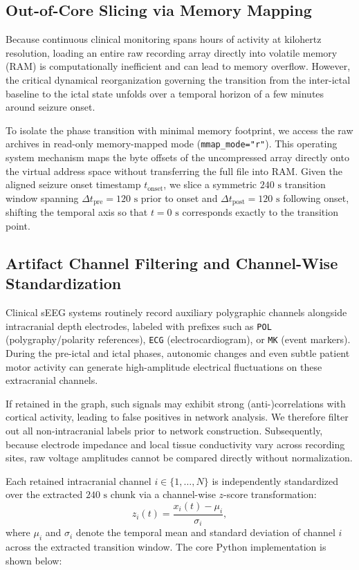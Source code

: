 \subsection{Out-of-Core Slicing via Memory Mapping}
Because continuous clinical monitoring spans hours of activity at kilohertz resolution, loading an entire raw recording array directly into volatile memory (RAM) is computationally inefficient and can lead to memory overflow. However, the critical dynamical reorganization governing the transition from the inter-ictal baseline to the ictal state unfolds over a temporal horizon of a few minutes around seizure onset.

To isolate the phase transition with minimal memory footprint, we access the raw archives in read-only memory-mapped mode (\texttt{mmap\_mode="r"}). This operating system mechanism maps the byte offsets of the uncompressed array directly onto the virtual address space without transferring the full file into RAM. Given the aligned seizure onset timestamp $t_{\text{onset}}$, we slice a symmetric $240\text{ s}$ transition window spanning $\Delta t_{\text{pre}} = 120\text{ s}$ prior to onset and $\Delta t_{\text{post}} = 120\text{ s}$ following onset, shifting the temporal axis so that $t = 0\text{ s}$ corresponds exactly to the transition point.

\subsection{Artifact Channel Filtering and Channel-Wise Standardization}
Clinical sEEG systems routinely record auxiliary polygraphic channels alongside intracranial depth electrodes, labeled with prefixes such as \texttt{POL} (polygraphy/polarity references), \texttt{ECG} (electrocardiogram), or \texttt{MK} (event markers). During the pre-ictal and ictal phases, autonomic changes and even subtle patient motor activity can generate high-amplitude electrical fluctuations on these extracranial channels.

If retained in the graph, such signals may exhibit strong (anti-)correlations with cortical activity, leading to false positives in network analysis. We therefore filter out all non-intracranial labels prior to network construction. Subsequently, because electrode impedance and local tissue conductivity vary across recording sites, raw voltage amplitudes cannot be compared directly without normalization.

Each retained intracranial channel $i \in \{1, \dots, N\}$ is independently standardized over the extracted $240\text{ s}$ chunk via a channel-wise $z$-score transformation:
\begin{equation}
    z_i(t) = \frac{x_i(t) - \mu_i}{\sigma_i},
    \label{eq:zscore}
\end{equation}
where $\mu_i$ and $\sigma_i$ denote the temporal mean and standard deviation of channel $i$ across the extracted transition window. The core Python implementation is shown below:

